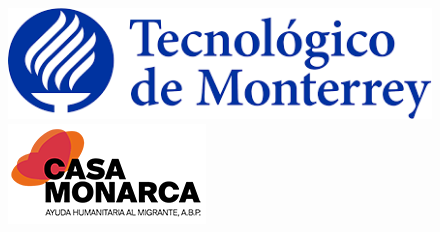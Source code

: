 \def\spa{40pt}

\thispagestyle{empty}

\begin{center}



\begin{figure}[htbp]
    \centering
    \begin{minipage}{0.4\textwidth}
        \centering
        \includegraphics[width=\textwidth]{Imagenes/logoTec.png}
    \end{minipage}
    \hfill
    \begin{minipage}{0.4\textwidth}
        \centering
        \includegraphics[width=\textwidth]{Imagenes/logoMonarca.png}
    \end{minipage}
\end{figure}



\end{center}
